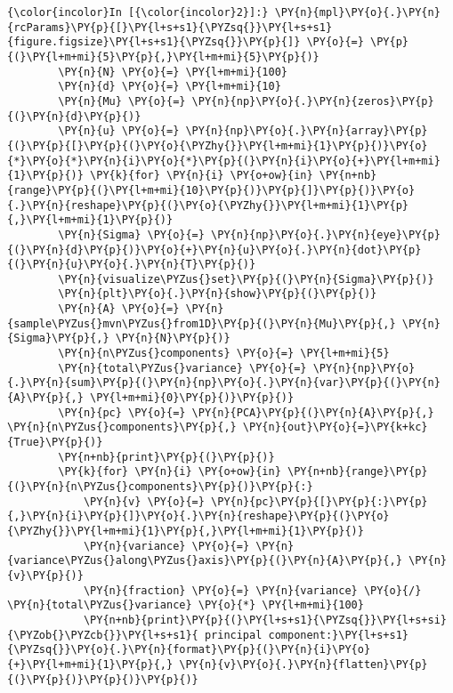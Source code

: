     \begin{Verbatim}[commandchars=\\\{\}]
{\color{incolor}In [{\color{incolor}2}]:} \PY{n}{mpl}\PY{o}{.}\PY{n}{rcParams}\PY{p}{[}\PY{l+s+s1}{\PYZsq{}}\PY{l+s+s1}{figure.figsize}\PY{l+s+s1}{\PYZsq{}}\PY{p}{]} \PY{o}{=} \PY{p}{(}\PY{l+m+mi}{5}\PY{p}{,}\PY{l+m+mi}{5}\PY{p}{)}
        \PY{n}{N} \PY{o}{=} \PY{l+m+mi}{100}
        \PY{n}{d} \PY{o}{=} \PY{l+m+mi}{10}
        \PY{n}{Mu} \PY{o}{=} \PY{n}{np}\PY{o}{.}\PY{n}{zeros}\PY{p}{(}\PY{n}{d}\PY{p}{)}
        \PY{n}{u} \PY{o}{=} \PY{n}{np}\PY{o}{.}\PY{n}{array}\PY{p}{(}\PY{p}{[}\PY{p}{(}\PY{o}{\PYZhy{}}\PY{l+m+mi}{1}\PY{p}{)}\PY{o}{*}\PY{o}{*}\PY{n}{i}\PY{o}{*}\PY{p}{(}\PY{n}{i}\PY{o}{+}\PY{l+m+mi}{1}\PY{p}{)} \PY{k}{for} \PY{n}{i} \PY{o+ow}{in} \PY{n+nb}{range}\PY{p}{(}\PY{l+m+mi}{10}\PY{p}{)}\PY{p}{]}\PY{p}{)}\PY{o}{.}\PY{n}{reshape}\PY{p}{(}\PY{o}{\PYZhy{}}\PY{l+m+mi}{1}\PY{p}{,}\PY{l+m+mi}{1}\PY{p}{)}
        \PY{n}{Sigma} \PY{o}{=} \PY{n}{np}\PY{o}{.}\PY{n}{eye}\PY{p}{(}\PY{n}{d}\PY{p}{)}\PY{o}{+}\PY{n}{u}\PY{o}{.}\PY{n}{dot}\PY{p}{(}\PY{n}{u}\PY{o}{.}\PY{n}{T}\PY{p}{)}
        \PY{n}{visualize\PYZus{}set}\PY{p}{(}\PY{n}{Sigma}\PY{p}{)}
        \PY{n}{plt}\PY{o}{.}\PY{n}{show}\PY{p}{(}\PY{p}{)}
        \PY{n}{A} \PY{o}{=} \PY{n}{sample\PYZus{}mvn\PYZus{}from1D}\PY{p}{(}\PY{n}{Mu}\PY{p}{,} \PY{n}{Sigma}\PY{p}{,} \PY{n}{N}\PY{p}{)}
        \PY{n}{n\PYZus{}components} \PY{o}{=} \PY{l+m+mi}{5}
        \PY{n}{total\PYZus{}variance} \PY{o}{=} \PY{n}{np}\PY{o}{.}\PY{n}{sum}\PY{p}{(}\PY{n}{np}\PY{o}{.}\PY{n}{var}\PY{p}{(}\PY{n}{A}\PY{p}{,} \PY{l+m+mi}{0}\PY{p}{)}\PY{p}{)}
        \PY{n}{pc} \PY{o}{=} \PY{n}{PCA}\PY{p}{(}\PY{n}{A}\PY{p}{,} \PY{n}{n\PYZus{}components}\PY{p}{,} \PY{n}{out}\PY{o}{=}\PY{k+kc}{True}\PY{p}{)}
        \PY{n+nb}{print}\PY{p}{(}\PY{p}{)}
        \PY{k}{for} \PY{n}{i} \PY{o+ow}{in} \PY{n+nb}{range}\PY{p}{(}\PY{n}{n\PYZus{}components}\PY{p}{)}\PY{p}{:}
            \PY{n}{v} \PY{o}{=} \PY{n}{pc}\PY{p}{[}\PY{p}{:}\PY{p}{,}\PY{n}{i}\PY{p}{]}\PY{o}{.}\PY{n}{reshape}\PY{p}{(}\PY{o}{\PYZhy{}}\PY{l+m+mi}{1}\PY{p}{,}\PY{l+m+mi}{1}\PY{p}{)}
            \PY{n}{variance} \PY{o}{=} \PY{n}{variance\PYZus{}along\PYZus{}axis}\PY{p}{(}\PY{n}{A}\PY{p}{,} \PY{n}{v}\PY{p}{)}
            \PY{n}{fraction} \PY{o}{=} \PY{n}{variance} \PY{o}{/} \PY{n}{total\PYZus{}variance} \PY{o}{*} \PY{l+m+mi}{100}
            \PY{n+nb}{print}\PY{p}{(}\PY{l+s+s1}{\PYZsq{}}\PY{l+s+si}{\PYZob{}\PYZcb{}}\PY{l+s+s1}{ principal component:}\PY{l+s+s1}{\PYZsq{}}\PY{o}{.}\PY{n}{format}\PY{p}{(}\PY{n}{i}\PY{o}{+}\PY{l+m+mi}{1}\PY{p}{,} \PY{n}{v}\PY{o}{.}\PY{n}{flatten}\PY{p}{(}\PY{p}{)}\PY{p}{)}\PY{p}{)}

\end{Verbatim}
